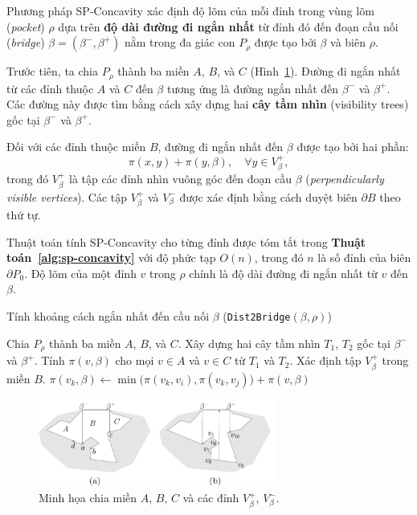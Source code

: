 \documentclass{article}
\begin{document}
Phương pháp SP-Concavity xác định độ lõm của mỗi đỉnh trong vùng lõm (\textit{pocket}) $\rho$ dựa trên 
\textbf{độ dài đường đi ngắn nhất} từ đỉnh đó đến đoạn cầu nối (\textit{bridge}) $\beta = (\beta^-, \beta^+)$ 
nằm trong đa giác con $P_\rho$ được tạo bởi $\beta$ và biên $\rho$.  

Trước tiên, ta chia $P_\rho$ thành ba miền $A$, $B$, và $C$ (Hình~\ref{fig:sp-concavity}).  
Đường đi ngắn nhất từ các đỉnh thuộc $A$ và $C$ đến $\beta$ tương ứng là đường ngắn nhất đến $\beta^-$ và $\beta^+$.  
Các đường này được tìm bằng cách xây dựng hai \textbf{cây tầm nhìn} (visibility trees) 
gốc tại $\beta^-$ và $\beta^+$.

Đối với các đỉnh thuộc miền $B$, đường đi ngắn nhất đến $\beta$ được tạo bởi hai phần:
\[
\pi(x, y) + \pi(y, \beta), \quad \forall y \in V^+_\beta,
\]
trong đó $V^+_\beta$ là tập các đỉnh nhìn vuông góc đến đoạn cầu $\beta$ 
(\textit{perpendicularly visible vertices}).  
Các tập $V^+_\beta$ và $V^-_\beta$ được xác định bằng cách duyệt biên $\partial B$ theo thứ tự.

Thuật toán tính SP-Concavity cho từng đỉnh được tóm tắt trong \textbf{Thuật toán~\ref{alg:sp-concavity}} 
với độ phức tạp $O(n)$, trong đó $n$ là số đỉnh của biên $\partial P_0$.  
Độ lõm của một đỉnh $v$ trong $\rho$ chính là độ dài đường đi ngắn nhất từ $v$ đến $\beta$.


\begin{algorithm}[H]
\caption{Tính khoảng cách ngắn nhất đến cầu nối $\beta$ (\texttt{Dist2Bridge}$(\beta, \rho)$)}
\label{alg:sp-concavity}
\begin{algorithmic}[1]
    \State Chia $P_\rho$ thành ba miền $A$, $B$, và $C$.
    \State Xây dựng hai cây tầm nhìn $T_1$, $T_2$ gốc tại $\beta^-$ và $\beta^+$.
    \State Tính $\pi(v, \beta)$ cho mọi $v \in A$ và $v \in C$ từ $T_1$ và $T_2$.
    \State Xác định tập $V^+_\beta$ trong miền $B$.
            \State $\pi(v_k, \beta) \gets \min\big(\pi(v_k, v_i), \pi(v_k, v_j)\big) + \pi(v, \beta)$
        \EndFor
    \EndFor
\end{algorithmic}
\end{algorithm}

\noindent

\begin{figure}[H]
    \centering
    \includegraphics[width=0.7\textwidth]{imgs/sp_concavity.png}
    \caption{Minh họa chia miền $A$, $B$, $C$ và các đỉnh $V^+_\beta$, $V^-_\beta$.}
    \label{fig:sp-concavity}
\end{figure}

\newpage





\end{document}
